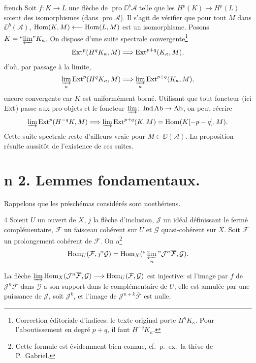 \begin{hyphenrules}{french}
Soit $f: K \to L$ une fl\`eche de $\operatorname{pro}\DD^b\mathcal{A}$ telle que les $H^p(K) \to H^p(L)$ soient des isomorphismes (dans $\operatorname{pro}\mathcal{A}$). Il s'agit de v\'erifier que pour tout $M$ dans $\DD^b(\mathcal{A})$, $\operatorname{Hom}(K,M) \longleftarrow \operatorname{Hom}(L,M)$ est un isomorphisme. Posons $K = \text{``$\varprojlim$''} K_{\kappa}$. On dispose d'une suite spectrale convergente\footnote{Correction \'editoriale d'indices: le texte original porte $H^qK_{\kappa}$. Pour l'aboutissement en degr\'e $p+q$, il faut $H^{-q}K_{\kappa}$.}
\[
\operatorname{Ext}^p(H^{q}K_{\kappa},M)\Longrightarrow\operatorname{Ext}^{p+q}(K_{\kappa},M),
\]
d'o\`u, par passage \`a la limite,
\[
\varinjlim_{\kappa}\operatorname{Ext}^p(H^{q}K_{\kappa},M)
\Longrightarrow\varinjlim_{\kappa}\operatorname{Ext}^{p+q}(K_{\kappa},M),
\]
encore convergente car $K$ est uniform\'ement born\'e. Utilisant que tout
foncteur (ici $\operatorname{Ext}$) passe aux pro-objets et le foncteur
$\varinjlim\colon\operatorname{Ind}\operatorname{Ab}\to\operatorname{Ab}$, on peut r\'ecrire
\[
\varinjlim\operatorname{Ext}^p(H^{-q}K,M)
\Longrightarrow\varinjlim\operatorname{Ext}^{p+q}(K,M)
=\operatorname{Hom}(K[-p-q],M).
\]
Cette suite spectrale reste d'ailleurs vraie pour $M \in \DD(\mathcal{A})$. La proposition r\'esulte aussit\^ot de l'existence de ces suites.

\section*{n\textdegree{} 2. Lemmes fondamentaux.}

Rappelons que les pr\'esch\'emas consid\'er\'es sont noeth\'eriens.

\begin{bookproposition}{4}\label{app:prop4}
Soient $U$ un ouvert de $X$, $j$ la fl\`eche d'inclusion, $\mathcal{J}$ un id\'eal d\'efinissant le ferm\'e compl\'ementaire, $\mathcal{F}$ un faisceau coh\'erent sur $U$ et $\mathcal{G}$ quasi-coh\'erent sur $X$. Soit $\overline{\mathcal{F}}$ un prolongement coh\'erent de $\mathcal{F}$. On a\footnote{Cette formule est \'evidemment bien connue, cf.\ p.\ ex.\ la th\`ese de P.\ Gabriel.}
\[
\operatorname{Hom}_{U}(\mathcal{F}, j^{*}\mathcal{G}) = \operatorname{Hom}_{X}(\text{``}\varprojlim_n\text{''} \mathcal{J}^{n}\overline{\mathcal{F}}, \mathcal{G}).
\]
\end{bookproposition}

La fl\`eche $\varinjlim \operatorname{Hom}_X(\mathcal{J}^{n}\overline{\mathcal{F}},\mathcal{G}) \longrightarrow \operatorname{Hom}_U(\mathcal{F},\mathcal{G})$ est injective: si l'image par $f$ de $\mathcal{J}^{n}\overline{\mathcal{F}}$ dans $\mathcal{G}$ a son support dans le compl\'ementaire de $U$, elle est annul\'ee par une puissance de $\mathcal{J}$, soit $\mathcal{J}^{k}$, et l'image de $\mathcal{J}^{n+k}\overline{\mathcal{F}}$ est nulle.


\end{hyphenrules}
